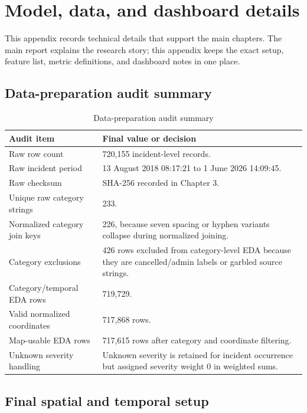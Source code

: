 \chapter{Model, data, and dashboard details}

This appendix records technical details that support the main chapters. The main report explains the research story; this appendix keeps the exact setup, feature list, metric definitions, and dashboard notes in one place.

\section{Data-preparation audit summary}

\begin{table}[H]
\centering
\caption{Data-preparation audit summary}
\label{tab:appendix_data_audit_summary}
\small
\begin{tabularx}{\textwidth}{L{0.36\textwidth}Y}
\toprule
\textbf{Audit item} & \textbf{Final value or decision} \\
\midrule
Raw row count & 720,155 incident-level records. \\
Raw incident period & 13 August 2018 08:17:21 to 1 June 2026 14:09:45. \\
Raw checksum & SHA-256 recorded in Chapter 3. \\
Unique raw category strings & 233. \\
Normalized category join keys & 226, because seven spacing or hyphen variants collapse during normalized joining. \\
Category exclusions & 426 rows excluded from category-level EDA because they are cancelled/admin labels or garbled source strings. \\
Category/temporal EDA rows & 719,729. \\
Valid normalized coordinates & 717,868 rows. \\
Map-usable EDA rows & 717,615 rows after category and coordinate filtering. \\
Unknown severity handling & Unknown severity is retained for incident occurrence but assigned severity weight 0 in weighted sums. \\
\bottomrule
\end{tabularx}
\end{table}

\section{Final spatial and temporal setup}

